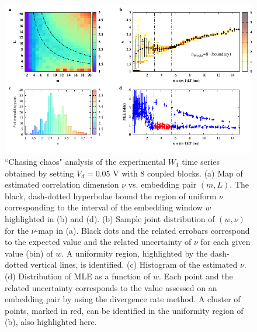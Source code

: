 \begin{figure}[H]
    \centering
    \includegraphics[width=\linewidth]{../blocks/8_blocks/2e5_points/plots/chaos_low.pdf}
    \caption{``Chasing chaos" analysis of the experimental $W_1$ time series obtained by setting $V_d=0.05$ V with 8 coupled blocks.
    (a) Map of estimated correlation dimension $\nu$ vs. embedding pair $(m, L)$.
    The black, dash-dotted hyperbolae bound the region of uniform $\nu$ corresponding to the interval of the
    embedding window $w$ highlighted in (b) and (d).
    (b) Sample joint distribution of $(w,\nu)$ for the $\nu$-map in (a).
    Black dots and the related errobars correspond to the expected value and the related uncertainty of $\nu$
    for each given value (bin) of $w$. A uniformity region, highlighted by the dash-dotted vertical lines,
    is identified. (c) Histogram of the estimated $\nu$. (d) Distribution of MLE as a function of $w$. Each point and the related
    uncertainty corresponds to the value assessed on an embedding pair by using the divergence rate method.
    A cluster of points, marked in red, can be identified in the uniformity region of (b), also highlighted here.}
    \label{fig:8 blocks chaos}
\end{figure}


